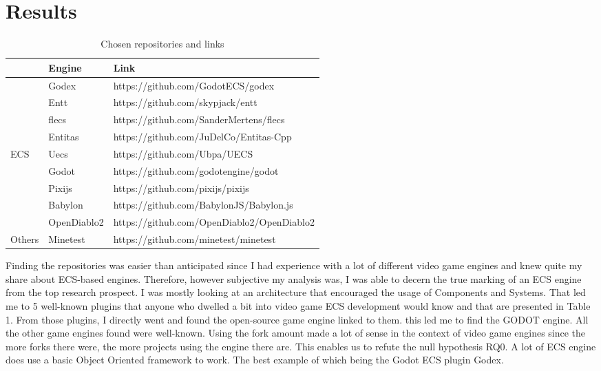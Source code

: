 \documentclass{IEEEcsmag}
\begin{document}
\section{Results}
\begin{table}[]
    \begin{tabular}{|l|l|l|}
        \hline
        \cellcolor[HTML]{000000} & Engine      & Link                                       \\ \hline
                                 & Godex       & https://github.com/GodotECS/godex          \\ \cline{2-3} 
                                 & Entt        & https://github.com/skypjack/entt           \\ \cline{2-3} 
                                 & flecs       & https://github.com/SanderMertens/flecs     \\ \cline{2-3} 
                                 & Entitas     & https://github.com/JuDelCo/Entitas-Cpp     \\ \cline{2-3} 
        \multirow{-5}{*}{ECS}    & Uecs        & https://github.com/Ubpa/UECS               \\ \hline
                                 & Godot       & https://github.com/godotengine/godot       \\ \cline{2-3} 
                                 & Pixijs      & https://github.com/pixijs/pixijs           \\ \cline{2-3} 
                                 & Babylon     & https://github.com/BabylonJS/Babylon.js    \\ \cline{2-3} 
                                 & OpenDiablo2 & https://github.com/OpenDiablo2/OpenDiablo2 \\ \cline{2-3} 
        \multirow{-5}{*}{Others} & Minetest    & https://github.com/minetest/minetest       \\ \hline
    \end{tabular}
    \caption{Chosen repositories and links}
\end{table}

Finding the repositories was easier than anticipated since I had experience with a lot of different video game engines and knew quite my share about ECS-based engines. Therefore, however subjective my analysis was, I was able to decern the true marking of an ECS engine from the top research prospect. I was mostly looking at an architecture that encouraged the usage of Components and Systems. That led me to 5 well-known plugins that anyone who dwelled a bit into video game ECS development would know and that are presented in Table 1. From those plugins, I directly went and found the open-source game engine linked to them. this led me to find the GODOT engine. All the other game engines found were well-known. Using the fork amount made a lot of sense in the context of video game engines since the more forks there were, the more projects using the engine there are. This enables us to refute the null hypothesis RQ0. A lot of ECS engine does use a basic Object Oriented framework to work. The best example of which being the Godot ECS plugin Godex. 
\end{document}
